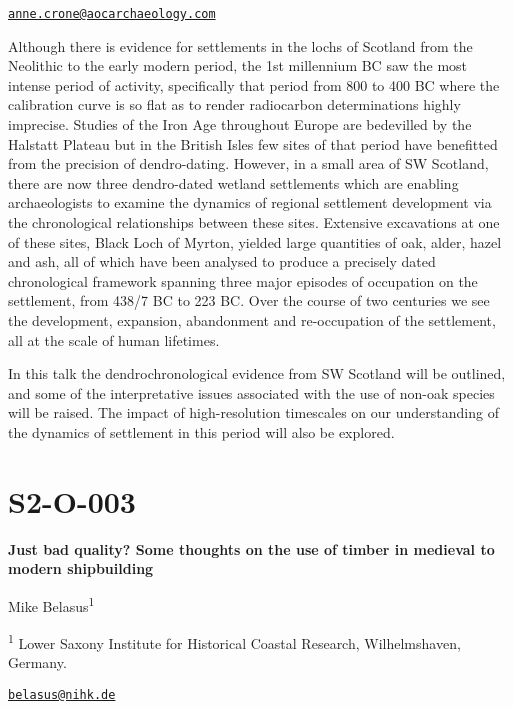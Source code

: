 \documentclass[
]{book}
\begin{document}
\href{mailto:anne.crone@aocarchaeology.com}{\nolinkurl{anne.crone@aocarchaeology.com}}

Although there is evidence for settlements in the lochs of Scotland from the Neolithic to the early modern period, the 1st millennium BC saw the most intense period of activity, specifically that period from 800 to 400 BC where the calibration curve is so flat as to render radiocarbon determinations highly imprecise. Studies of the Iron Age throughout Europe are bedevilled by the Halstatt Plateau but in the British Isles few sites of that period have benefitted from the precision of dendro-dating. However, in a small area of SW Scotland, there are now three dendro-dated wetland settlements which are enabling archaeologists to examine the dynamics of regional settlement development via the chronological relationships between these sites. Extensive excavations at one of these sites, Black Loch of Myrton, yielded large quantities of oak, alder, hazel and ash, all of which have been analysed to produce a precisely dated chronological framework spanning three major episodes of occupation on the settlement, from 438/7 BC to 223 BC. Over the course of two centuries we see the development, expansion, abandonment and re-occupation of the settlement, all at the scale of human lifetimes.

In this talk the dendrochronological evidence from SW Scotland will be outlined, and some of the interpretative issues associated with the use of non-oak species will be raised. The impact of high-resolution timescales on our understanding of the dynamics of settlement in this period will also be explored.

\hypertarget{s2-o-003}{%
\section*{S2-O-003}\label{s2-o-003}}

\textbf{Just bad quality? Some thoughts on the use of timber in medieval to modern shipbuilding}

Mike Belasus\textsuperscript{1}

\textsuperscript{1} Lower Saxony Institute for Historical Coastal Research, Wilhelmshaven, Germany.

\href{mailto:belasus@nihk.de}{\nolinkurl{belasus@nihk.de}}
\end{document}
